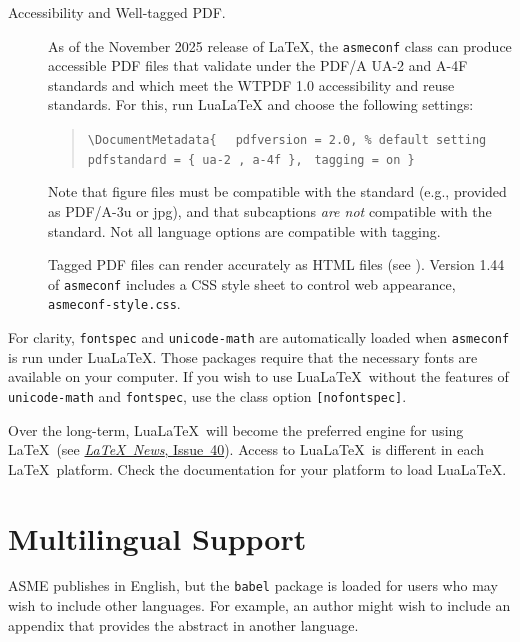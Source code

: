 \documentclass[colorlinks,upint,subscriptcorrection,varvw,balance,loadscripts,german,vietamese]{asmeconf} %
\newcommand*\LuaLaTeX{Lua\LaTeX}
\begin{document}
\begin{description}
\item[Accessibility and Well-tagged PDF.] As of the November 2025 release of \LaTeX, the \texttt{asmeconf} class can produce accessible PDF files that validate under 
the PDF/A UA-2 and A-4F standards and which meet the WTPDF 1.0 accessibility and reuse standards. For this, run \LuaLaTeX{} and choose the following settings: 
 \begin{quote}
	\verb|\DocumentMetadata{ | \newline
	\verb| pdfversion = 2.0, % default setting | \newline
	\verb| pdfstandard = { ua-2 , a-4f },| \newline
	\verb| tagging = on }|
\end{quote}
Note that figure files must be compatible with the standard (e.g., provided as PDF/A-3u or jpg), and that subcaptions \emph{are not} compatible with the standard.  Not all language options are compatible with tagging.

Tagged PDF files can render accurately as HTML files (see ). Version 1.44 of \texttt{asmeconf} includes a CSS style sheet to control web appearance, \texttt{asmeconf-style.css}. 

\end{description}

For clarity, \texttt{fontspec} and \texttt{unicode-math} are automatically loaded when \texttt{asmeconf} is run under \LuaLaTeX. Those packages require that the necessary fonts are available on your computer.  If you wish to use \LuaLaTeX\  without the features of \texttt{unicode-math} and \texttt{fontspec}, use the class option \texttt{[nofontspec]}. 

Over the long-term, \LuaLaTeX\  will become the preferred engine for using \LaTeX\ (see \href{https://www.latex-project.org/news/latex2e-news/ltnews40.pdf}{\emph{LaTeX\ News}, Issue~40}). Access to \LuaLaTeX\  is different in each \LaTeX\ platform. Check the documentation for your platform to load \LuaLaTeX.

\section{Multilingual Support}\label{appendix:c}

ASME publishes in English, but the \texttt{babel} package is loaded for 
users who may wish to include other languages. For example, an author might wish to include an appendix that provides the 
abstract in another language.
\end{document}
